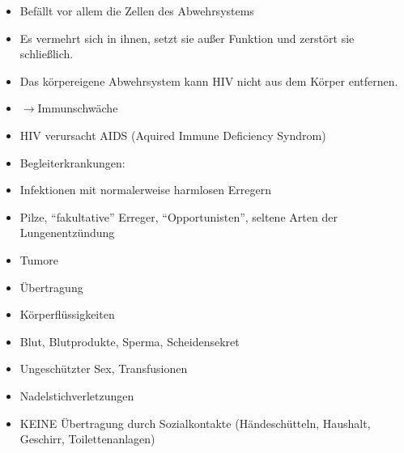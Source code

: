 \documentclass{article}
\begin{document}
\begin{itemize}
\item {\mdseries
Bef\"allt vor allem die Zellen des Abwehrsystems }

\item {\mdseries
Es vermehrt sich in ihnen, setzt sie au{\ss}er Funktion und zerst\"ort
sie schlie{\ss}lich.}

\item {\mdseries
Das k\"orpereigene Abwehrsystem kann HIV nicht aus dem K\"orper
entfernen.}

\end{itemize}
\begin{itemize}
\item {\mdseries
${\rightarrow}$Immunschw\"ache}

\end{itemize}
\begin{itemize}
\item {\mdseries
HIV verursacht AIDS (Aquired Immune Deficiency Syndrom)}

\item {\mdseries
Begleiterkrankungen: }

\end{itemize}
\begin{itemize}
\item {\mdseries
Infektionen mit normalerweise harmlosen Erregern}

\end{itemize}
\begin{itemize}
\item {\mdseries
Pilze, {\textquotedblleft}fakultative{\textquotedblright} Erreger,
{\textquotedblleft}Opportunisten{\textquotedblright}, seltene Arten der
Lungenentz\"undung}

\end{itemize}
\begin{itemize}
\item {\mdseries
Tumore}

\end{itemize}
\begin{itemize}
\item {\mdseries
\"Ubertragung}

\end{itemize}
\begin{itemize}
\item {\mdseries
K\"orperfl\"ussigkeiten}

\item {\mdseries
Blut, Blutprodukte, Sperma, Scheidensekret}

\item {\mdseries
Ungesch\"utzter Sex, Transfusionen}

\item {\mdseries
Nadelstichverletzungen}

\item {\mdseries
KEINE \"Ubertragung durch Sozialkontakte (H\"andesch\"utteln, Haushalt,
Geschirr, Toilettenanlagen)}

\end{itemize}
\end{document}

